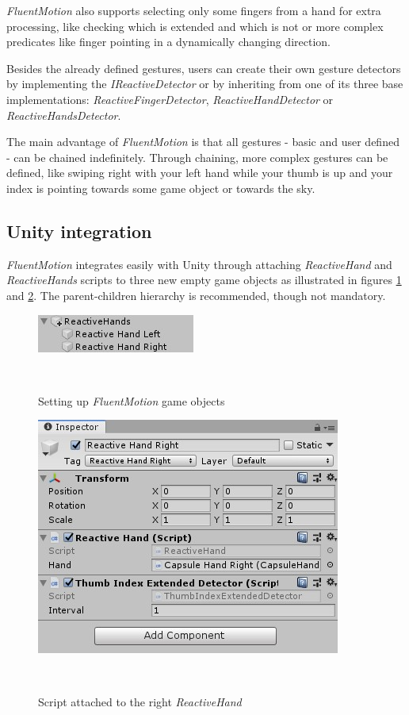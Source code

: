\documentclass{sigchi}
\def\fluentmotion{\textit{FluentMotion}}
\begin{document}
\fluentmotion{} also supports selecting only some fingers from a hand for extra processing, like checking which is extended and which is not or more complex predicates like finger pointing in a dynamically changing direction.


Besides the already defined gestures, users can create their own gesture detectors by implementing the \textit{IReactiveDetector} or by inheriting from one of its three base implementations: \textit{ReactiveFingerDetector}, \textit{ReactiveHandDetector} or \textit{ReactiveHandsDetector}.


The main advantage of \fluentmotion{} is that all gestures - basic and user defined - can be chained indefinitely. Through chaining, more complex gestures can be defined, like swiping right with your left hand while your thumb is up and your index is pointing towards some game object or towards the sky.

\subsection{Unity integration}

\fluentmotion{} integrates easily with Unity through attaching \textit{ReactiveHand} and \textit{ReactiveHands} scripts to three new empty game objects as illustrated in figures \ref{fig:figure6} and \ref{fig:figure7}. The parent-children hierarchy is recommended, though not mandatory.


  \begin{figure}[h]
    \centering
    \includegraphics[width=0.9\columnwidth]{figures/FluentMotion_setup}
    \caption{Setting up \fluentmotion{} game objects}~\label{fig:figure6}
  \end{figure}

\begin{figure}[h]
  \centering
  \includegraphics[width=0.9\columnwidth]{figures/FluentMotion_script_attached}
  \caption{Script attached to the right \textit{ReactiveHand}}~\label{fig:figure7}
\end{figure}
\end{document}

